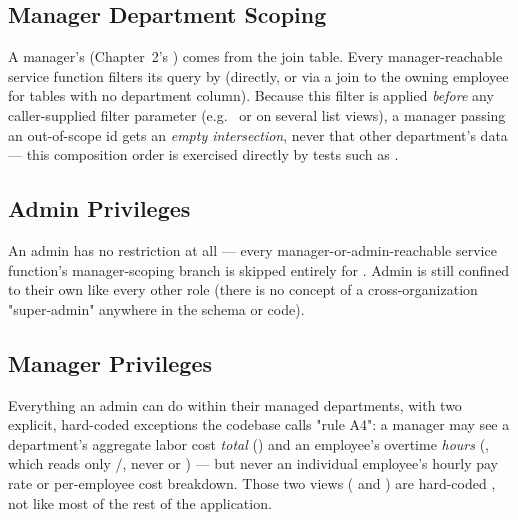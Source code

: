 \subsection*{Manager Department Scoping}

A manager's  (Chapter~2's )
comes from the  join table. Every
manager-reachable service function filters its query by
 (directly, or via a join
to the owning employee for tables with no department column). Because
this filter is applied \emph{before} any caller-supplied filter
parameter (e.g.\  or  on
several list views), a manager passing an out-of-scope id gets an
\emph{empty intersection}, never that other department's data --- this
composition order is exercised directly by tests such as
.

\subsection*{Admin Privileges}

An admin has no  restriction at all --- every
manager-or-admin-reachable service function's manager-scoping branch is
skipped entirely for . Admin is still confined to
their own  like every other role (there is no
concept of a cross-organization "super-admin" anywhere in the schema or
code).

\subsection*{Manager Privileges}

Everything an admin can do within their managed departments, with two
explicit, hard-coded exceptions the codebase calls "rule A4": a manager
may see a department's aggregate labor cost \emph{total}
() and an employee's
overtime \emph{hours} (, which reads
only /, never  or
) --- but never an individual employee's hourly pay rate or
per-employee cost breakdown. Those two views
( and
) are hard-coded
, not  like most of the rest of the application.

